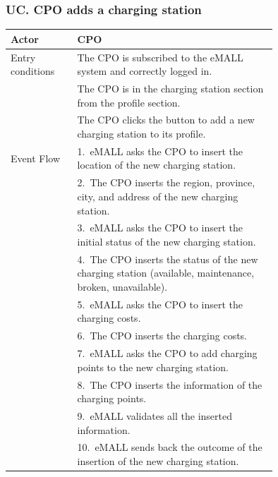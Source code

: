 \subsubsection*{UC\cuc . CPO adds a charging station}
\begin{center}
    \begin{longtable}{lp{0.75\linewidth}}
        \hline
        Actor            & CPO                                                                                                       \\
        \hline
        Entry conditions & The CPO is subscribed to the eMALL system and correctly logged in.                                        \\
        & The CPO is in the charging station section from the profile section.                                      \\
        & The CPO clicks the button to add a new charging station to its profile.                                   \\
        \hline
        Event Flow       & 1.\ eMALL asks the CPO to insert the location of the new charging station.                                \\
        & 2.\ The CPO inserts the region, province, city, and address of the new charging station.                  \\
        & 3.\ eMALL asks the CPO to insert the initial status of the new charging station.                          \\
        & 4.\ The CPO inserts the status of the new charging station (available, maintenance, broken, unavailable). \\
        & 5.\ eMALL asks the CPO to insert the charging costs.                                                      \\
        & 6.\ The CPO inserts the charging costs.                                                                   \\
        & 7.\ eMALL asks the CPO to add charging points to the new charging station.                                \\
        & 8.\ The CPO inserts the information of the charging points.                                               \\
        & 9.\ eMALL validates all the inserted information.                                                         \\
        & 10.\ eMALL sends back the outcome of the insertion of the new charging station.                           \\

\end{longtable}
\end{center}
